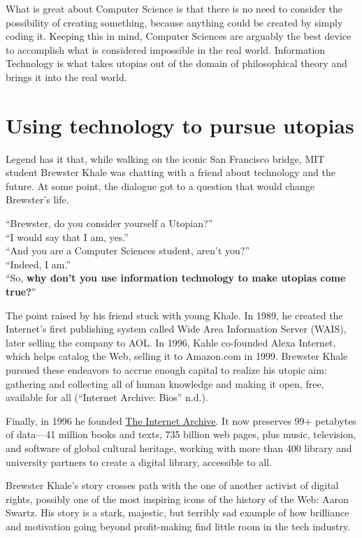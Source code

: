 \documentclass[
  a4paper,
]{book}
\begin{document}
What is great about Computer Science is that there is no need to consider the possibility of creating something, because anything could be created by simply coding it. Keeping this in mind, Computer Sciences are arguably the best device to accomplish what is considered impossible in the real world. Information Technology is what takes utopias out of the domain of philosophical theory and brings it into the real world.

\hypertarget{using-technology-to-pursue-utopias}{%
\section{Using technology to pursue utopias}\label{using-technology-to-pursue-utopias}}

Legend has it that, while walking on the iconic San Francisco bridge, MIT student Brewster Khale was chatting with a friend about technology and the future. At some point, the dialogue got to a question that would change Brewster's life.

``Brewster, do you consider yourself a Utopian?''\\
``I would say that I am, yes.''\\
``And you are a Computer Sciences student, aren't you?''\\
``Indeed, I am.''\\
``So, \textbf{why don't you use information technology to make utopias come true?}''

The point raised by his friend stuck with young Khale. In 1989, he created the Internet's first publishing system called Wide Area Information Server (WAIS), later selling the company to AOL. In 1996, Kahle co-founded Alexa Internet, which helps catalog the Web, selling it to Amazon.com in 1999. Brewster Khale pursued these endeavors to accrue enough capital to realize his utopic aim: gathering and collecting all of human knowledge and making it open, free, available for all {({``Internet {Archive}: {Bios}''} n.d.)}.

Finally, in 1996 he founded \href{https://archive.org}{The Internet Archive}. It now preserves 99+ petabytes of data---41 million books and texts, 735 billion web pages, plus music, television, and software of global cultural heritage, working with more than 400 library and university partners to create a digital library, accessible to all.

Brewster Khale's story crosses path with the one of another activist of digital rights, possibly one of the most inspiring icons of the history of the Web: Aaron Swartz. His story is a stark, majestic, but terribly sad example of how brilliance and motivation going beyond profit-making find little room in the tech industry.
\end{document}
